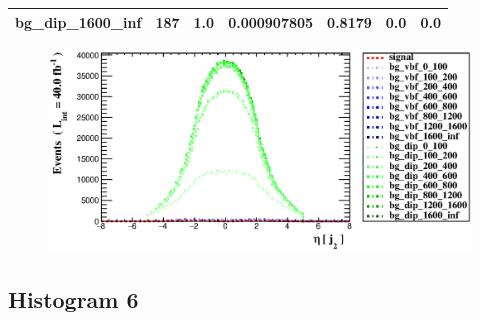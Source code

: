 \documentclass[a4paper, 10pt]{article}
\begin{document}
\begin{table}[H]
\begin{center}
\begin{tabular}{|m{23.0mm}|m{23.0mm}|m{18.0mm}|m{19.0mm}|m{19.0mm}|m{19.0mm}|m{19.0mm}|}
      \hline
      {\cellcolor{white}         bg\_dip\_1600\_inf}& {\cellcolor{white}         187}& {\cellcolor{white}         1.0}& {\cellcolor{white}         0.000907805}& {\cellcolor{white}         0.8179}& {\cellcolor{green}         0.0}& {\cellcolor{green}         0.0}\\
\hline
    \end{tabular}
  \end{center}
\end{table}

\begin{figure}[H]
  \begin{center}
    \includegraphics[scale=0.45]{selection_4.eps}\\
\caption{   }
  \end{center}
\end{figure}
      \newpage
\subsection{ Histogram 6}
\end{document}
